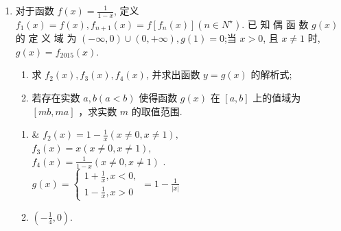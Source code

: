 \begin{enumerate}
\item 对于函数 $f(x)=\frac{1}{1-x}$, 定义 $f_1(x)=f(x), f_{n+1}(x)=f\left[f_n(x)\right]\left(n \in N^{\star}\right)$.
已 知 偶 函 数 $g(x)$ 的 定 义 域 为 $(-\infty, 0) \cup(0,+\infty), g(1)=0$;当 $x>0$, 且 $x \neq 1$ 时, $g(x)=f_{2015}(x)$.
\begin{enumerate}
\item 求 $f_2(x), f_3(x), f_4(x)$, 并求出函数 $y=g(x)$ 的解析式;
\item 若存在实数 $a, b(a<b)$ 使得函数 $g(x)$ 在 $[a, b]$ 上的值域为 $[m b, m a]$ ，求实数 $m$ 的取值范围.
\end{enumerate}
\begin{jieda}
\begin{enumerate}
\item & $f_2(x)=1-\frac{1}{x}(x \neq 0, x \neq 1), $\\
$f_3(x)=x(x \neq 0, x \neq 1),$ \\
 $f_4(x)=\frac{1}{1-x}(x \neq 0, x \neq 1)$ . \\
$g(x)=\left \{\begin{array}{l}
1+\frac{1}{x}, x<0, \\
1-\frac{1}{x}, x>0
\end{array}=1-\frac{1}{|x|} \right. $
\item $\left(-\frac{1}{4}, 0\right)$.
\end{enumerate}
\end{jieda}
\begin{vspace_}
\vsp[5]
\end{vspace_}


\end{enumerate}


